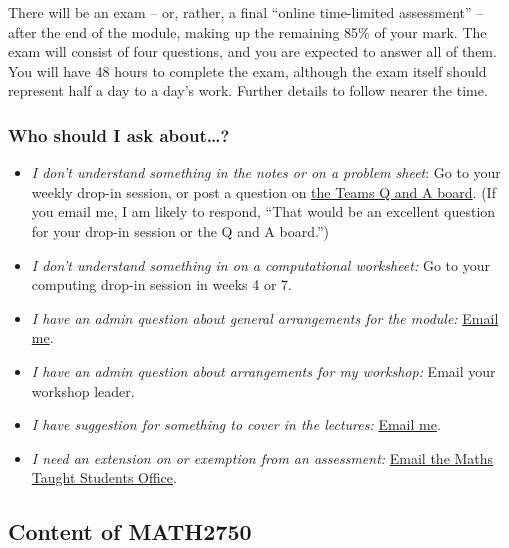 \documentclass[
  a4paper,
]{article}
\providecommand{\tightlist}{%
  \setlength{\itemsep}{0pt}\setlength{\parskip}{0pt}}
\theoremstyle{definition}
\theoremstyle{definition}
\theoremstyle{definition}
\theoremstyle{remark}
\begin{document}
There will be an exam -- or, rather, a final ``online time-limited assessment'' -- after the end of the module, making up the remaining 85\% of your mark. The exam will consist of four questions, and you are expected to answer all of them. You will have 48 hours to complete the exam, although the exam itself should represent half a day to a day's work. Further details to follow nearer the time.

\hypertarget{ask}{%
\subsubsection*{Who should I ask about\ldots?}\label{ask}}

\begin{itemize}
\tightlist
\item
  \emph{I don't understand something in the notes or on a problem sheet}: Go to your weekly drop-in session, or post a question on \href{https://teams.microsoft.com/l/channel/19\%3a5fcd058b7074426ca1f7d1cf2052d3b4\%40thread.tacv2/Q\%2520and\%2520A?groupId=1c138eac-0c54-43b0-9d20-d4cf3d65c40a\&tenantId=bdeaeda8-c81d-45ce-863e-5232a535b7cb}{the Teams Q and A board}. (If you email me, I am likely to respond, ``That would be an excellent question for your drop-in session or the Q and A board.'')
\item
  \emph{I don't understand something in on a computational worksheet:} Go to your computing drop-in session in weeks 4 or 7.
\item
  \emph{I have an admin question about general arrangements for the module:} \href{mailto:m.aldridge@leeds.ac.uk}{Email me}.
\item
  \emph{I have an admin question about arrangements for my workshop:} Email your workshop leader.
\item
  \emph{I have suggestion for something to cover in the lectures:} \href{mailto:m.aldridge@leeds.ac.uk}{Email me}.
\item
  \emph{I need an extension on or exemption from an assessment:} \href{mailto:Maths.Taught.Students@leeds.ac.uk}{Email the Maths Taught Students Office}.
\end{itemize}

\hypertarget{about-content}{%
\subsection*{Content of MATH2750}\label{about-content}}
\end{document}
